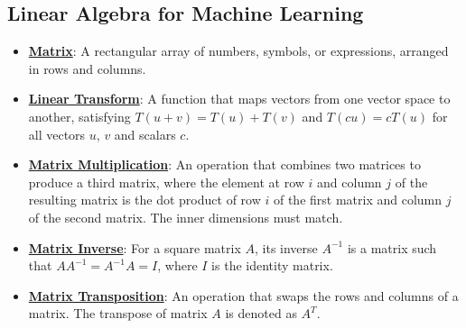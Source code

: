 \documentclass{article}%
\begin{document}
\subsection{Linear Algebra for Machine Learning}%
\label{subsec:LinearAlgebraforMachineLearning}%
\begin{itemize}[leftmargin=*]%
\item \href{https://purdue.brightspace.com/d2l/common/assets/pdfjs-d2l-dist/1.0.14-legacy/web/viewer.html?file=\%2Fcontent\%2Fenforced\%2F1095467-wl.202510.CS.24300.001\%2F04L1-Linear Algebra Primer.pdf\%3Fou\%3D1095467\&lang=en-us\&container=d2l-fileviewer-rendered-pdf\&fullscreen=d2l-fileviewer-rendered-pdf-dialog\&height=667#page=4}{\textbf{Matrix}}: A rectangular array of numbers, symbols, or expressions, arranged in rows and columns.%
\item \href{https://purdue.brightspace.com/d2l/common/assets/pdfjs-d2l-dist/1.0.14-legacy/web/viewer.html?file=\%2Fcontent\%2Fenforced\%2F1095467-wl.202510.CS.24300.001\%2F04L1-Linear Algebra Primer.pdf\%3Fou\%3D1095467\&lang=en-us\&container=d2l-fileviewer-rendered-pdf\&fullscreen=d2l-fileviewer-rendered-pdf-dialog\&height=667#page=5}{\textbf{Linear Transform}}: A function that maps vectors from one vector space to another, satisfying $T(u + v) = T(u) + T(v)$ and $T(cu) = cT(u)$ for all vectors $u$, $v$ and scalars $c$.%
\item \href{https://purdue.brightspace.com/d2l/common/assets/pdfjs-d2l-dist/1.0.14-legacy/web/viewer.html?file=\%2Fcontent\%2Fenforced\%2F1095467-wl.202510.CS.24300.001\%2F04L1-Linear Algebra Primer.pdf\%3Fou\%3D1095467\&lang=en-us\&container=d2l-fileviewer-rendered-pdf\&fullscreen=d2l-fileviewer-rendered-pdf-dialog\&height=667#page=14}{\textbf{Matrix Multiplication}}: An operation that combines two matrices to produce a third matrix, where the element at row $i$ and column $j$ of the resulting matrix is the dot product of row $i$ of the first matrix and column $j$ of the second matrix. The inner dimensions must match.%
\item \href{https://purdue.brightspace.com/d2l/common/assets/pdfjs-d2l-dist/1.0.14-legacy/web/viewer.html?file=\%2Fcontent\%2Fenforced\%2F1095467-wl.202510.CS.24300.001\%2F04L1-Linear Algebra Primer.pdf\%3Fou\%3D1095467\&lang=en-us\&container=d2l-fileviewer-rendered-pdf\&fullscreen=d2l-fileviewer-rendered-pdf-dialog\&height=667#page=10}{\textbf{Matrix Inverse}}: For a square matrix $A$, its inverse $A^{-1}$ is a matrix such that $AA^{-1} = A^{-1}A = I$, where $I$ is the identity matrix.%
\item \href{https://purdue.brightspace.com/d2l/common/assets/pdfjs-d2l-dist/1.0.14-legacy/web/viewer.html?file=\%2Fcontent\%2Fenforced\%2F1095467-wl.202510.CS.24300.001\%2F04L1-Linear Algebra Primer.pdf\%3Fou\%3D1095467\&lang=en-us\&container=d2l-fileviewer-rendered-pdf\&fullscreen=d2l-fileviewer-rendered-pdf-dialog\&height=667#page=16}{\textbf{Matrix Transposition}}: An operation that swaps the rows and columns of a matrix. The transpose of matrix $A$ is denoted as $A^T$.%

\end{itemize}
\end{document}
